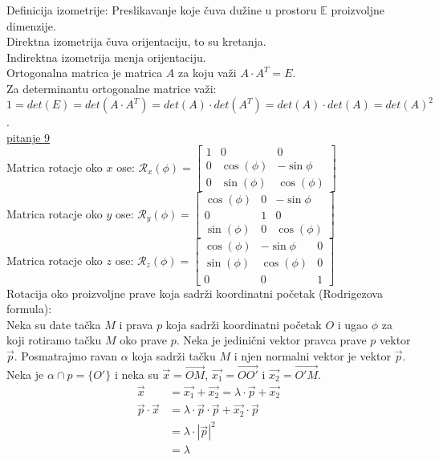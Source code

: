\documentclass[12pt]{article}
\newcommand{\vek}[1]{\overrightarrow{#1}}
\begin{document}
\vspace*{1cm}

Definicija izometrije: Preslikavanje koje čuva dužine u prostoru
$\mathbb{E}$ proizvoljne dimenzije.\\
Direktna izometrija čuva orijentaciju, to su kretanja.\\
Indirektna izometrija menja orijentaciju.\\
Ortogonalna matrica je matrica $A$ za koju važi $A\cdot A^T=E$.\\
Za determinantu ortogonalne matrice važi:\\
$1=det(E)=det(A\cdot A^T)=det(A)\cdot det(A^T)=det(A)\cdot det(A)=det(A)^2$.\\
\hyperref[subsec:pitanje_9]{pitanje 9}\\
Matrica rotacje oko $x$ ose: $\mathcal{R}_x(\phi)=\begin{bmatrix}
        1 & 0          & 0           \\
        0 & \cos(\phi) & -\sin{\phi} \\
        0 & \sin(\phi) & \cos(\phi)
    \end{bmatrix}$\\[0.5cm]
Matrica rotacje oko $y$ ose: $\mathcal{R}_y(\phi)=\begin{bmatrix}
        \cos(\phi) & 0 & -\sin{\phi} \\
        0          & 1 & 0           \\
        \sin(\phi) & 0 & \cos(\phi)
    \end{bmatrix}$\\[0.5cm]
Matrica rotacje oko $z$ ose: $\mathcal{R}_z(\phi)=\begin{bmatrix}
        \cos(\phi) & -\sin{\phi} & 0 \\
        \sin(\phi) & \cos(\phi)  & 0 \\
        0          & 0           & 1
    \end{bmatrix}$\\[0.5cm]
Rotacija oko proizvoljne prave koja sadrži koordinatni početak (Rodrigezova formula):\\
Neka su date tačka $M$ i prava $p$ koja sadrži koordinatni početak $O$ i ugao $\phi$ za koji rotiramo tačku $M$ oko prave $p$.
Neka je jedinični vektor pravca prave $p$ vektor $\vek{p}$.
Posmatrajmo ravan $\alpha$ koja sadrži tačku $M$ i njen normalni vektor je vektor $\vek{p}$.
Neka je $\alpha\cap p =\{O'\}$ i neka su $\vek{x}=\vek{OM}$, $\vek{x_1}=\vek{OO'}$ i $\vek{x_2}=\vek{O'M}$.
\begin{align*}
    \vek{x}             & =\vek{x_1}+\vek{x_2} = \lambda\cdot\vek{p}+\vek{x_2}   \\
    \vek{p}\cdot\vek{x} & =\lambda\cdot\vek{p}\cdot\vek{p}+\vek{x_2}\cdot\vek{p} \\
                        & =\lambda\cdot|\vek{p}|^2                               \\
                        & =\lambda                                               \\
\end{align*}
\end{document}
